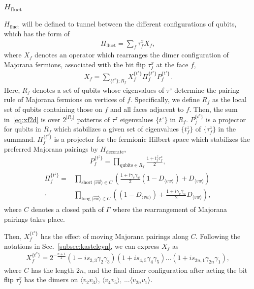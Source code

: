 \documentclass[12pt]{article}
\numberwithin{equation}{section}
\begin{document}
\subsubsection{$H_{\mathrm{fluct}}$}
$H_{\mathrm{fluct}}$ will be defined to tunnel between the different configurations of qubits, which has the form of
\begin{align}
    H_{\mathrm{fluct}}=\sum_f \tau_f^x X_f,
\end{align}
where $X_f$ denotes an operator which rearranges the dimer configuration of Majorana fermions, associated with the bit flip $\tau_f^x$ at the face $f$,
\begin{align}
    X_f=\sum_{\{t^z\};  R_f}X_f^{\{t^z\}}\Pi_f^{\{t^z\}}P_f^{\{t^z\}}.
    \label{eq:xf2d}
\end{align}
Here, $R_f$ denotes a set of qubits whose eigenvalues of $\tau^z$ determine the pairing rule of Majorana fermions on vertices of $f$. Specifically, we define $R_f$ as the local set of qubits containing those on $f$ and all faces adjacent to $f$. 
Then, the sum in~\eqref{eq:xf2d} is over $2^{|R_f|}$ patterns of $\tau^z$ eigenvalues $\{t^z\}$ in $R_f$.  $P_{f}^{\{t^z\}}$ is a projector for qubits in $R_f$ which stabilizes a given set of eigenvalues $\{t^z_f\}$ of $\{\tau^z_f\}$ in the summand. $\Pi_f^{\{t^z\}}$ is a projector for the fermionic Hilbert space which stabilizes the preferred Majorana pairings by $H_{\mathrm{decorate}}$,
\begin{align}
    P_{f}^{\{t^z\}}=\prod_{\mathrm{qubits}\in R_f}
    \frac{1+t^z_f\tau^z_f}{2},
    \label{eq:pf}
\end{align}
\begin{align}
\begin{split}
    \Pi_{f}^{\{t^z\}}=&\prod_{\mathrm{short}\ \langle \overrightarrow{vw}\rangle\in C}\left(\frac{1+i\gamma_v\gamma_w}{2}(1-D_{\langle vw\rangle})+D_{\langle vw\rangle}\right)\\
    \cdot&\prod_{\mathrm{long}\ \langle \overrightarrow{vw}\rangle\in C}\left((1-D_{\langle vw\rangle})+\frac{1+i\gamma_v\gamma_w}{2}D_{\langle vw\rangle}\right),
    \end{split}
\end{align}
where $C$ denotes a closed path of $\Gamma$ where the rearrangement of Majorana pairings takes place.

Then, $X_f^{\{t^z\}}$ has the effect of moving Majorana pairings along $C$. Following the notations in Sec.~\ref{subsec:kasteleyn}, we can express $X_f$ as
\begin{align}
    X_f^{\{t^z\}}=2^{-\frac{n+1}{2}}(1+is_{2,3}\gamma_2\gamma_3)(1+is_{4,5}\gamma_4\gamma_5)\dots(1+is_{2n,1}\gamma_{2n}\gamma_1),
\end{align}
where $C$ has the length $2n$, and the final dimer configuration after acting the bit flip $\tau^x_f$ has the dimers on $\langle v_2v_3\rangle$, $\langle v_4v_5\rangle$, $\dots\langle v_{2n}v_{1}\rangle$.
\end{document}
